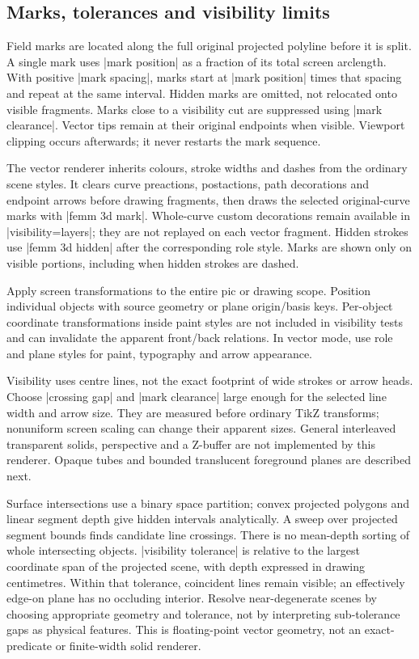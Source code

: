 \subsection{Marks, tolerances and visibility limits}
Field marks are located along the full original projected polyline before it
is split. A single mark uses |mark position| as a fraction of its total screen
arclength. With positive |mark spacing|, marks start at |mark position| times
that spacing and repeat at the same interval. Hidden marks are omitted, not
relocated onto visible fragments. Marks close to a visibility cut are suppressed
using |mark clearance|. Vector tips remain at their original endpoints when
visible. Viewport clipping occurs afterwards; it never restarts the mark sequence.

The vector renderer inherits colours, stroke widths and dashes from the ordinary
scene styles. It clears curve preactions, postactions, path decorations and
endpoint arrows before drawing fragments, then draws the selected original-curve
marks with |femm 3d mark|. Whole-curve custom decorations remain available in
|visibility=layers|; they are not replayed on each vector fragment. Hidden
strokes use |femm 3d hidden| after the corresponding role style. Marks are
shown only on visible portions, including when hidden strokes are dashed.

Apply screen transformations to the entire pic or drawing scope. Position
individual objects with source geometry or plane origin/basis keys. Per-object
coordinate transformations inside paint styles are not included in visibility
tests and can invalidate the apparent front/back relations. In vector mode,
use role and plane styles for paint, typography and arrow appearance.

Visibility uses centre lines, not the exact footprint of wide strokes or arrow
heads. Choose |crossing gap| and |mark clearance| large enough for the selected
line width and arrow size. They are measured before ordinary TikZ transforms;
nonuniform screen scaling can change their apparent sizes. General interleaved transparent solids, perspective and a Z-buffer are not
implemented by this renderer. Opaque tubes and bounded translucent foreground
planes are described next.

Surface intersections use a binary space partition; convex projected polygons
and linear segment depth give hidden intervals analytically. A sweep over
projected segment bounds finds candidate line crossings. There is no mean-depth
sorting of whole intersecting objects. |visibility tolerance| is relative to
the largest coordinate span of the projected scene, with depth expressed in
drawing centimetres. Within that tolerance, coincident lines remain visible;
an effectively edge-on plane has no occluding interior. Resolve near-degenerate
scenes by choosing appropriate geometry and tolerance, not by interpreting
sub-tolerance gaps as physical features. This is floating-point vector geometry,
not an exact-predicate or finite-width solid renderer.

